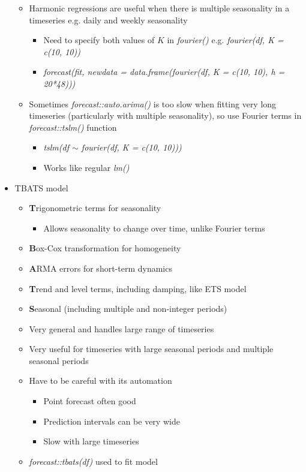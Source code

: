 \documentclass{article}\usepackage[]{graphicx}\usepackage[]{color}
\begin{document}
\begin{itemize}
\begin{itemize}
        \item Harmonic regressions are useful when there is multiple seasonality in a timeseries e.g. daily and weekly seasonality
        \begin{itemize}
            \item Need to specify both values of $K$ in \textit{fourier()} e.g. \textit{fourier(df, K = c(10, 10))}
            \item \textit{forecast(fit, newdata = data.frame(fourier(df, K = c(10, 10), h = 20*48)))}
        \end{itemize}
        \item Sometimes \textit{forecast::auto.arima()} is too slow when fitting very long timeseries (particularly with multiple seasonality), so use Fourier terms in \textit{forecast::tslm()} function
        \begin{itemize}
            \item \textit{tslm(df $\sim$ fourier(df, K = c(10, 10)))}
            \item Works like regular \textit{lm()}
        \end{itemize}
    \end{itemize}
    \item TBATS model
    \begin{itemize}
        \item \textbf{T}rigonometric terms for seasonality
        \begin{itemize}
            \item Allows seasonality to change over time, unlike Fourier terms
        \end{itemize}
        \item \textbf{B}ox-Cox transformation for homogeneity
        \item \textbf{A}RMA errors for short-term dynamics
        \item \textbf{T}rend and level terms, including damping, like ETS model
        \item \textbf{S}easonal (including multiple and non-integer periods)
        \item Very general and handles large range of timeseries
        \item Very useful for timeseries with large seasonal periods and multiple seasonal periods
        \item Have to be careful with its automation
        \begin{itemize}
            \item Point forecast often good
            \item Prediction intervals can be very wide
            \item Slow with large timeseries
        \end{itemize}
        \item \textit{forecast::tbats(df)} used to fit model
    \end{itemize}
\end{itemize}
\end{document}
